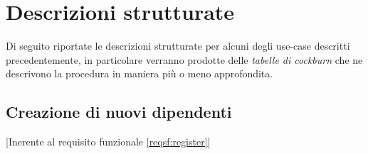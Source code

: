 \section{Descrizioni strutturate}
Di seguito riportate le descrizioni strutturate per alcuni degli use-case descritti precedentemente, in particolare verranno prodotte delle \textit{tabelle di cockburn} che ne descrivono la procedura in maniera più o meno approfondita.

\begingroup


\hypersetup{allcolors=reqfrregister}
\subsection{Creazione di nuovi dipendenti}[Inerente al requisito funzionale \ref{reqsf:register}]

